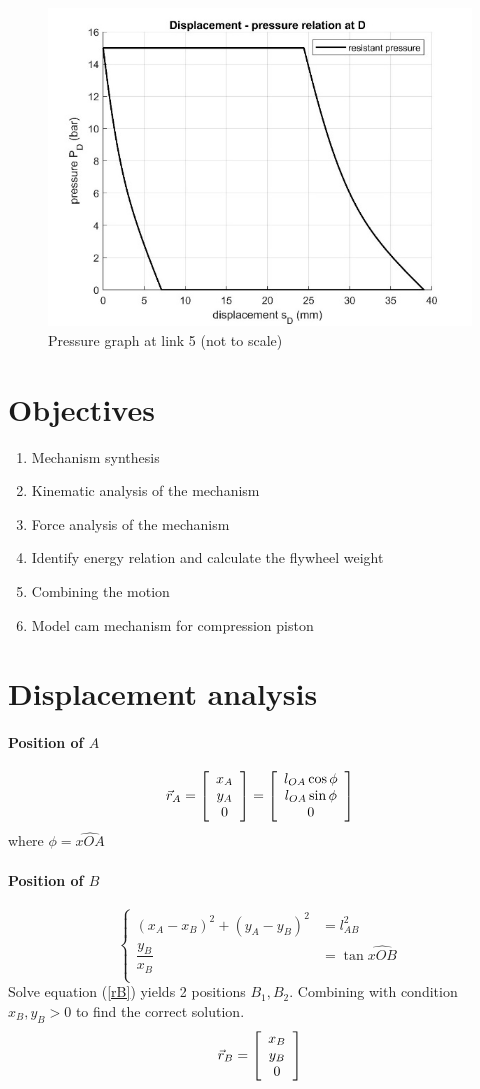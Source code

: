\begin{figure}
	\centering
	\includegraphics[width=0.7\linewidth]{2.2b}
	\caption{Pressure graph at link 5 (not to scale)}
	\label{fig:2b}
\end{figure}
\section{Objectives}
\begin{enumerate}
	\item Mechanism synthesis \cite{li_1984_hng}
	\item Kinematic analysis of the mechanism
	\item Force  analysis of the mechanism
	\item Identify energy relation and calculate the flywheel weight
	\item Combining the motion
	\item Model cam mechanism for compression piston
\end{enumerate}
\section{Displacement analysis}
\paragraph{Position of $ A $}
\begin{equation}\label{rA}
\vec{r}_A=
\left[ \begin{array}{c} x_A\\ y_A\\ 0 \end{array}\right]=\left[ \begin{array}{c} l_{OA}\cos \phi\\ l_{OA}\sin \phi\\ 0 \end{array}\right]
\end{equation}
where $ \phi=\widehat {xOA} $
\paragraph{Position of $ B $}
\begin{equation}\label{rB}
	\left\{
		\begin{array}{cl}
		(x_A-x_B)^2+(y_A-y_B)^2&=l_{AB}^2\\
		\dfrac{y_B}{x_B}&=\tan \widehat{xOB}\\
		\end{array}
	\right.
\end{equation}
Solve equation (\ref{rB}) yields 2 positions $ B_1, B_2 $. Combining with condition $ x_B,y_B>0 $ to find the correct solution.
\[\vec{r}_B=
\left[ \begin{array}{c} x_B\\ y_B\\ 0 \end{array}\right]\]
